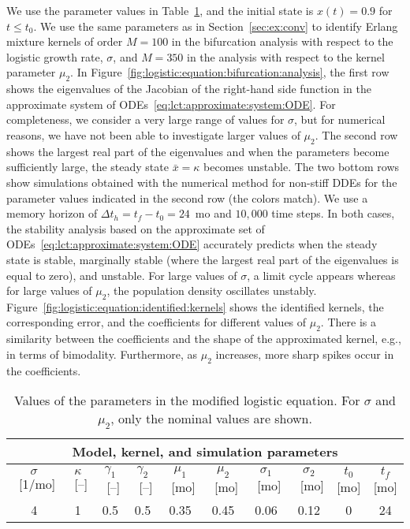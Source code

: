 We use the parameter values in Table~\ref{tab:logistic:parameters}, and the initial state is $x(t) = 0.9$ for $t \leq t_0$. We use the same parameters as in Section~\ref{sec:ex:conv} to identify Erlang mixture kernels of order $M = 100$ in the bifurcation analysis with respect to the logistic growth rate, $\sigma$, and $M = 350$ in the analysis with respect to the kernel parameter $\mu_2$. In Figure~\ref{fig:logistic:equation:bifurcation:analysis}, the first row shows the eigenvalues of the Jacobian of the right-hand side function in the approximate system of ODEs~\eqref{eq:lct:approximate:system:ODE}. For completeness, we consider a very large range of values for $\sigma$, but for numerical reasons, we have not been able to investigate larger values of $\mu_2$. The second row shows the largest real part of the eigenvalues and when the parameters become sufficiently large, the steady state $\bar x = \kappa$ becomes unstable. The two bottom rows show simulations obtained with the numerical method for non-stiff DDEs for the parameter values indicated in the second row (the colors match). We use a memory horizon of $\Delta t_h = t_f - t_0 = 24$~mo and $10,000$ time steps. In both cases, the stability analysis based on the approximate set of ODEs~\eqref{eq:lct:approximate:system:ODE} accurately predicts when the steady state is stable, marginally stable (where the largest real part of the eigenvalues is equal to zero), and unstable. For large values of $\sigma$, a limit cycle appears whereas for large values of $\mu_2$, the population density oscillates unstably.
%
Figure~\ref{fig:logistic:equation:identified:kernels} shows the identified kernels, the corresponding error, and the coefficients for different values of $\mu_2$. There is a similarity between the coefficients and the shape of the approximated kernel, e.g., in terms of bimodality. Furthermore, as $\mu_2$ increases, more sharp spikes occur in the coefficients.
%
\begin{table}[t]
	\centering
	\caption{Values of the parameters in the modified logistic equation. For $\sigma$ and $\mu_2$, only the nominal values are shown.}
	\label{tab:logistic:parameters}
	\footnotesize
	\begin{tabular}{cccccccccc}
		\toprule
		\multicolumn{10}{c}{Model, kernel, and simulation parameters} \\
		\midrule
		$\sigma$~[1/mo] & $\kappa$~[--] & $\gamma_1$~[--] & $\gamma_2$~[--] & $\mu_1$~[mo] & $\mu_2$~[mo] & $\sigma_1$~[mo] & $\sigma_2$~[mo] & $t_0$ [mo] & $t_f$ [mo] \\
		4 & 1 & 0.5 & 0.5 & 0.35 & 0.45 & 0.06 & 0.12 & 0 & 24 \\
		\bottomrule
	\end{tabular}
\end{table}
